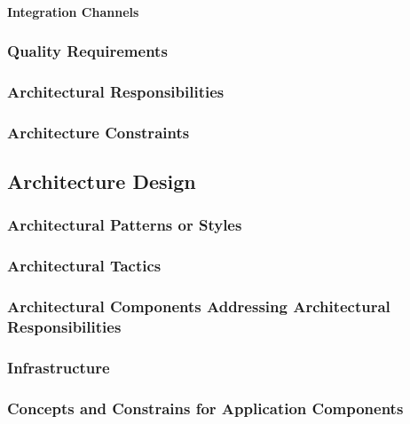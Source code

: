 \documentclass[11pt,a4paper]{article}
\begin{document}
\paragraph{Integration Channels}


\subsubsection{Quality Requirements}


\subsubsection{Architectural Responsibilities}


\subsubsection{Architecture Constraints}
\label{sec:systemArchitecturalConstraints}


\subsection{Architecture Design}
\subsubsection{Architectural Patterns or Styles}


\subsubsection{Architectural Tactics}

\subsubsection{Architectural Components Addressing Architectural Responsibilities}


\subsubsection{Infrastructure}

\subsubsection{Concepts and Constrains for Application Components}
\end{document}
